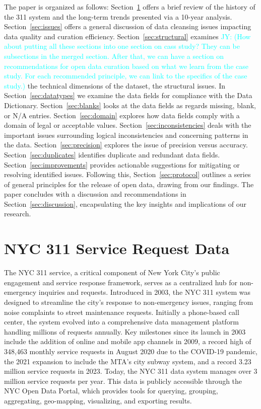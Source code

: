 \documentclass[12pt, titlepage]{article}
\newcommand{\jy}[1]{\textcolor{cyan}{JY: (#1)}}
\begin{document}
The paper is organized as follows:
Section~\ref{sec:data} offers a brief review of the history of the 311
system and the long-term trends presented via a 10-year analysis.
Section~\ref{sec:issues} offers a 
general discussion of data cleansing issues impacting data 
quality and curation efficiency. Section~\ref{sec:structural} examines
\jy{How about putting all these sections into one section on cass
  study? They can be subsections in the merged section.
  After that, we can have a section on recommendations for open
  data curation based on what we learn from the case study. For each
  recommended principle, we can link to the specifics of the case
  study.}
the technical dimensions of the dataset, the structural issues. 
In Section~\ref{sec:datatypes} we examine the data fields for compliance 
with the Data Dictionary. Section~\ref{sec:blanks} looks at the 
data fields as regards missing, blank, or N/A entries. Section~\ref{sec:domain} 
explores how data fields comply with a domain of legal 
or acceptable values. Section~\ref{sec:inconsistencies} deals 
with the important issues surrounding logical inconsistencies 
and concerning patterns in the data. Section~\ref{sec:precision} 
explores the issue of precision versus accuracy. Section~\ref{sec:duplicates}
identifies duplicate and redundant data fields. Section~\ref{sec:improvements} provides 
actionable suggestions for mitigating or resolving identified issues. 
Following this, Section~\ref{sec:protocol} outlines a series of general 
principles for the release of open data, drawing from our findings. The 
paper concludes with a discussion and recommendations in 
Section~\ref{sec:discussion}, encapsulating the key insights and 
implications of our research.



\section{NYC 311 Service Request Data} 
\label{sec:data}
The NYC 311 service, a critical component of New York City's public
engagement and service response framework, serves as a centralized hub
for non-emergency inquiries and requests. Introduced in 2003, the NYC
311 system was designed to streamline the city's response to
non-emergency issues, ranging from noise complaints to street
maintenance requests. Initially a phone-based call center, the system
evolved into a comprehensive data management platform handling
millions of requests annually. Key milestones since its launch in 2003
include the addition of online and mobile app channels in 2009, a
record high of 348,463 monthly service requests in August 2020 due to
the COVID-19 pandemic, the 2021 expansion to include the MTA's city
subway system, and a record 3.23 million service requests in
2023. Today, the NYC 311 data system manages over 3 million service
requests per year. This data is publicly accessible through the NYC Open Data
Portal, which provides tools for querying, grouping, aggregating,
geo-mapping, visualizing, and exporting results.
\end{document}
